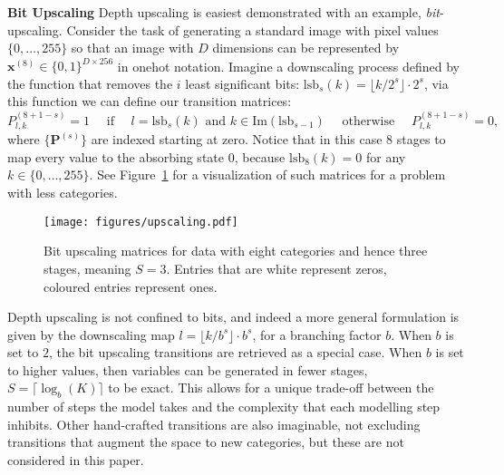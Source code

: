 \documentclass{article} \usepackage{iclr2022_conference,times}
\def\vx{{\bm{x}}}
\begin{document}
\textbf{Bit Upscaling} \hspace{.2cm}
Depth upscaling is easiest demonstrated with an example, \textit{bit}-upscaling. Consider the task of generating a standard image with pixel values $\{0, \ldots, 255\}$ so that an image with $D$ dimensions can be represented by $\vx^{(8)} \in \{0, 1\}^{D \times 256}$ in onehot notation.
Imagine a downscaling process defined by the function that removes the $i$ least significant bits: $\mathrm{lsb}_s(k) = \lfloor k / 2^s \rfloor \cdot 2^s$, via this function we can define our transition matrices:
$$P_{l,k}^{(8 + 1 - s)} = 1 \quad \text{ if } \quad l = \mathrm{lsb}_{s}(k) \text{ and } k \in \mathrm{Im}(\mathrm{lsb}_{s-1}) \quad \text{ otherwise } \quad P_{l,k}^{(8 + 1 - s)} = 0,$$
where $\{\mathbf{P}^{(s)}\}$ are indexed starting at zero. Notice that in this case $8$ stages to map every value to the absorbing state $0$, because $\mathrm{lsb}_8(k) = 0$ for any $k \in \{0, \ldots, 255\}$. See Figure~\ref{fig:upscaling} for a visualization of such matrices for a problem with less categories.

\begin{figure}[H]
    \vspace{-.1cm}
    \centering
    \texttt{[image: figures/upscaling.pdf]}
    \vspace{-.3cm}
    \caption{Bit upscaling matrices for data with eight categories and hence three stages, meaning $S = 3$. Entries that are white represent zeros, coloured entries represent ones.}
    \label{fig:upscaling}
    \vspace{-.3cm}
\end{figure}

Depth upscaling is not confined to bits, and indeed a more general formulation is given by the downscaling map $l = \lfloor k / b^s \rfloor \cdot b^s$, for a branching factor $b$. When $b$ is set to $2$, the bit upscaling transitions are retrieved as a special case. When $b$ is set to higher values, then variables can be generated in fewer stages, $S = \lceil \log_b (K) \rceil$ to be exact. This allows for a unique trade-off between the number of steps the model takes and the complexity that each modelling step inhibits. Other hand-crafted transitions are also imaginable, not excluding transitions that augment the space to new categories, but these are not considered in this paper.
\end{document}
